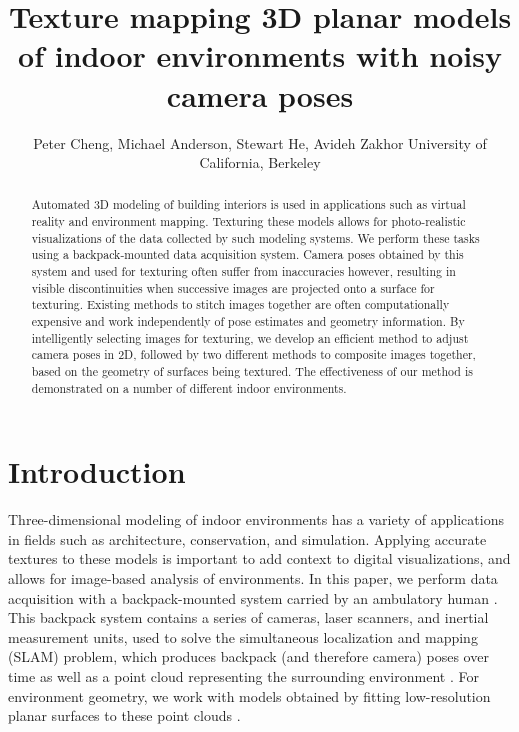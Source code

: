 \documentclass[]{spie}  %
\title{Texture mapping 3D planar models of indoor environments with noisy camera poses}
\author{Peter Cheng, Michael Anderson, Stewart He, Avideh Zakhor
\skiplinehalf
University of California, Berkeley\\
}
\begin{document}
\maketitle

\begin{abstract}
  Automated 3D modeling of building interiors is used in applications
  such as virtual reality and environment mapping. Texturing these
  models allows for photo-realistic visualizations of the data
  collected by such modeling systems. We perform these tasks using a
  backpack-mounted data acquisition system. Camera poses obtained by
  this system and used for texturing often suffer from inaccuracies
  however, resulting in visible discontinuities when successive images
  are projected onto a surface for texturing. Existing methods to
  stitch images together are often computationally expensive and work
  independently of pose estimates and geometry information. By
  intelligently selecting images for texturing, we develop
  an efficient method to adjust camera poses in 2D, followed by two
  different methods to composite images together, based on the
  geometry of surfaces being textured. The effectiveness of our
  method is demonstrated on a number of different indoor
  environments.
\end{abstract}



\section{Introduction}
\label{sec:introduction} %
Three-dimensional modeling of indoor environments has a variety of
applications in fields such as architecture, conservation, and
simulation. Applying accurate textures to these models is important to
add context to digital visualizations, and allows for image-based
analysis of environments. In this paper, we perform data acquisition
with a backpack-mounted system carried by an ambulatory human
\cite{liu2010indoor}. This backpack system contains a series of
cameras, laser scanners, and inertial measurement units, used to solve
the simultaneous localization and mapping (SLAM) problem, which
produces backpack (and therefore camera) poses over time as well as a
point cloud representing the surrounding environment
\cite{chen2010indoor, liu2010indoor, kua2012loopclosure}. For
environment geometry, we work with models obtained by fitting
low-resolution planar surfaces to these point clouds
\cite{sanchez2012point}.
\end{document}
